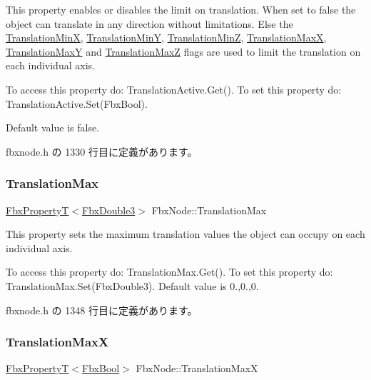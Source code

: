 This property enables or disables the limit on translation. When set to {\ttfamily false} the object can translate in any direction without limitations. Else the \hyperlink{class_fbx_node_a8ffb0049319dbb88db7c0536b4c97339}{Translation\+MinX}, \hyperlink{class_fbx_node_a61c15c2ecc1e454320759c68e95e44b3}{Translation\+MinY}, \hyperlink{class_fbx_node_a0e89c2861ae7bb58014dd0f4ffe069be}{Translation\+MinZ}, \hyperlink{class_fbx_node_a07a5df097d43dc3069669a448b3b8179}{Translation\+MaxX}, \hyperlink{class_fbx_node_a68ce7c657e10023ec08fc70461a3624e}{Translation\+MaxY} and \hyperlink{class_fbx_node_a82452c5c84518939525f69ebbf1cd190}{Translation\+MaxZ} flags are used to limit the translation on each individual axis.

To access this property do\+: Translation\+Active.\+Get(). To set this property do\+: Translation\+Active.\+Set(\+Fbx\+Bool).

Default value is false. 

 fbxnode.\+h の 1330 行目に定義があります。

\mbox{\label{class_fbx_node_ad5867ca599b10137c3caf2eb102eaff7}} 
\subsubsection{\texorpdfstring{Translation\+Max}{TranslationMax}}
{\footnotesize\ttfamily \hyperlink{class_fbx_property_t}{Fbx\+PropertyT}$<$\hyperlink{fbxtypes_8h_ae0a96f14cde566774c7553aa7523b7a7}{Fbx\+Double3}$>$ Fbx\+Node\+::\+Translation\+Max}

This property sets the maximum translation values the object can occupy on each individual axis.

To access this property do\+: Translation\+Max.\+Get(). To set this property do\+: Translation\+Max.\+Set(\+Fbx\+Double3). Default value is 0.,0.,0. 

 fbxnode.\+h の 1348 行目に定義があります。

\mbox{\label{class_fbx_node_a07a5df097d43dc3069669a448b3b8179}} 
\subsubsection{\texorpdfstring{Translation\+MaxX}{TranslationMaxX}}
{\footnotesize\ttfamily \hyperlink{class_fbx_property_t}{Fbx\+PropertyT}$<$\hyperlink{fbxtypes_8h_a92e0562b2fe33e76a242f498b362262e}{Fbx\+Bool}$>$ Fbx\+Node\+::\+Translation\+MaxX}

